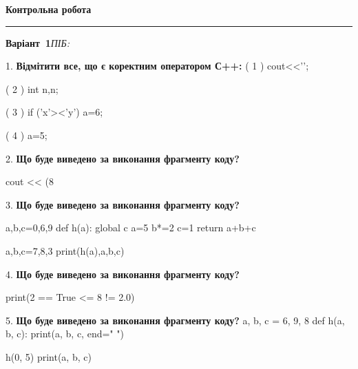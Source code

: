 \documentclass[11pt]{article}
\begin{document}
{\centering\Large\bfseries Контрольна робота\par}
\medskip
\noindent\rule{\linewidth}{0.5pt}
\smallskip
\noindent\textbf{Варіант \No\,1}\hfill \textit{ПІБ:}\,\underline{\hspace{60mm}}
\vspace{4mm}

1. %
\textbf{Відмітити все, що є коректним оператором С++:}
( 1 ) cout<<'\n';

( 2 ) int n,n;

( 3 ) if ('x'><'y') a=6;

( 4 ) {a=5;}
\vspace{5mm}

2. \textbf{Що буде виведено за виконання фрагменту коду?}

cout << (8 %
\vspace{5mm}

3. \textbf{Що буде виведено за виконання фрагменту коду?}

a,b,c=0,6,9
def h(a):
global c    a=5
    b*=2
    c=1
    return a+b+c

a,b,c=7,8,3
print(h(a),a,b,c)
\vspace{5mm}

4. \textbf{Що буде виведено за виконання фрагменту коду?}

print(2 == True <= 8 != 2.0)
\vspace{5mm}

5. \textbf{Що буде виведено за виконання фрагменту коду?}
a, b, c = 6, 9, 8
def h(a, b, c):
    print(a, b, c, end=" ")

h(0, 5)
print(a, b, c)
\vspace{5mm}
\end{document}
